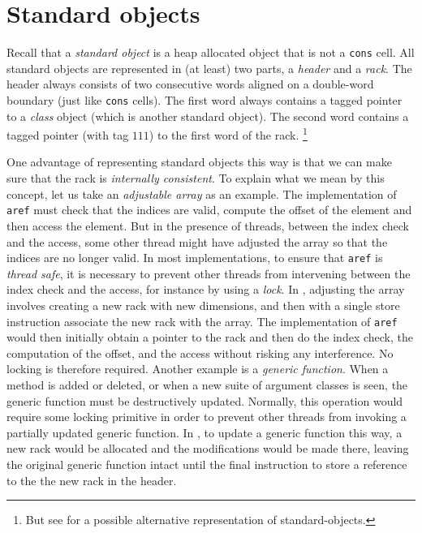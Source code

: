 \section{Standard objects}
\label{sec-data-representation-standard-object}

Recall that a \emph{standard object} is a heap allocated object that
is not a \texttt{cons} cell.  All standard objects are represented in
(at least) two parts, a \emph{header} and a \emph{rack}.  The
header always consists of two consecutive words aligned on a
double-word boundary (just like \texttt{cons} cells).  The first word
always contains a tagged pointer to a \emph{class} object (which is
another standard object).  The second word contains a tagged pointer
(with tag $111$) to the first word of the rack.%
\footnote{But see
for a possible alternative representation of standard-objects.}

One advantage of representing standard objects this way is that we can
make sure that the rack is \emph{internally consistent}.  To explain
what we mean by this concept, let us take an \emph{adjustable array}
as an example.  The implementation of \texttt{aref} must check that
the indices are valid, compute the offset of the element and then
access the element.  But in the presence of threads, between the index
check and the access, some other thread might have adjusted the array
so that the indices are no longer valid.  In most implementations, to
ensure that \texttt{aref} is \emph{thread safe}, it is necessary to
prevent other threads from intervening between the index check and the
access, for instance by using a \emph{lock}.  In \sysname{}, adjusting
the array involves creating a new rack with new dimensions, and then
with a single store instruction associate the new rack with the array.
The implementation of \texttt{aref} would then initially obtain a
pointer to the rack and then do the index check, the computation of
the offset, and the access without risking any interference.  No
locking is therefore required.  Another example is a \emph{generic
  function}.  When a method is added or deleted, or when a new suite
of argument classes is seen, the generic function must be
destructively updated.  Normally, this operation would require some
locking primitive in order to prevent other threads from invoking a
partially updated generic function.  In \sysname{}, to update a
generic function this way, a new rack would be allocated and the
modifications would be made there, leaving the original generic
function intact until the final instruction to store a reference to
the the new rack in the header.

